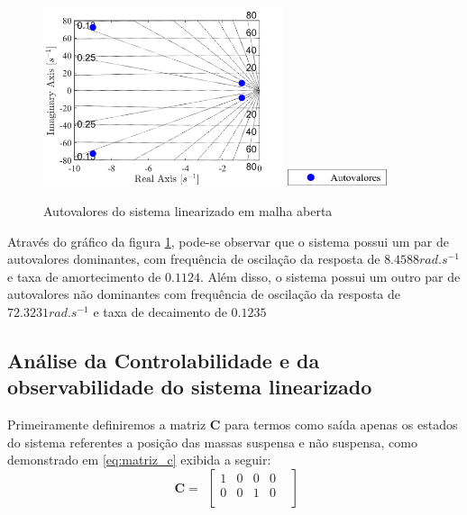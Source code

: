\documentclass[a4paper]{ifacconf}
\begin{document}
    \FloatBarrier
    \begin{figure}[htbp]
        \begin{centering}
            \includegraphics[width=7cm]{img/autovalores_malha_aberta.png}
            \includegraphics[width=3cm]{img/autovalores_malha_aberta_leg.png}
            \caption{Autovalores do sistema linearizado em malha aberta}
            \label{fig:autovalores_malha_aberta}
        \end{centering}
    \end{figure}
    \FloatBarrier
    
    Através do gráfico da figura \ref{fig:autovalores_malha_aberta}, pode-se observar que o sistema possui um par de autovalores dominantes, com frequência de oscilação da resposta de $8.4588 rad.s^{-1}$ e taxa de amortecimento de $0.1124$. Além disso, o sistema possui um outro par de autovalores não dominantes com frequência de oscilação da resposta de $72.3231 rad.s^{-1}$ e taxa de decaimento de $0.1235$
    
    \subsection{Análise da Controlabilidade e da observabilidade do sistema linearizado}
    
    Primeiramente definiremos a matriz $\mathbf{C}$ para termos como saída apenas os estados do sistema referentes a posição das massas suspensa e não suspensa, como demonstrado em \ref{eq:matriz_c} exibida a seguir:
     \FloatBarrier
    \begin{equation} \label{eq:matriz_c}
        \begin{split}
             \mathbf{C}=
        \end{split}
        \begin{bmatrix}
            1&0&0&0&\\
            0&0&1&0&\\
        \end{bmatrix}
    \end{equation}
    
\end{document}

